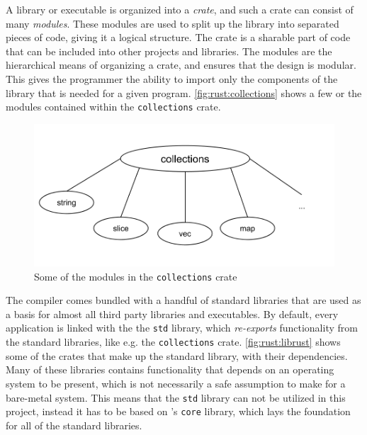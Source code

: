 A \rust library or executable is organized into a \emph{crate}, and such a crate can consist of many \emph{modules}.
These modules are used to split up the library into separated pieces of code, giving it a logical structure.
The crate is a sharable part of \rust code that can be included into other projects and libraries.
The modules are the hierarchical means of organizing a crate, and ensures that the design is modular.
This gives the programmer the ability to import only the components of the library that is needed for a given program.
\autoref{fig:rust:collections} shows a few or the modules contained within the \rust \texttt{collections} crate.

\begin{figure}[H]
  \begin{center}
    \includegraphics[scale=0.3]{figures/background/rust/libcollections.png}
  \end{center}
  \caption{Some of the modules in the \texttt{collections} crate}
  \label{fig:rust:collections}
\end{figure}

The \rust compiler comes bundled with a handful of standard libraries that are used as a basis for almost all third party libraries and executables.
By default, every \rust application is linked with the the \rust \texttt{std} library, which \emph{re-exports} functionality from the standard libraries, like e.g. the \texttt{collections} crate.
\autoref{fig:rust:librust} shows some of the crates that make up the standard library, with their dependencies.
Many of these libraries contains functionality that depends on an operating system to be present, which is not necessarily a safe assumption to make for a bare-metal system.
This means that the \texttt{std} library can not be utilized in this project, instead it has to be based on \rust's \texttt{core} library, which lays the foundation for all of the standard libraries.


